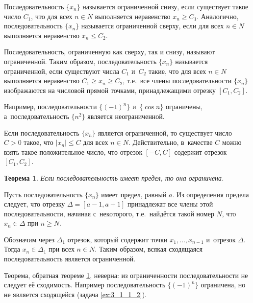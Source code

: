 
Последовательность $\{x_{n}\}$ называется ограниченной снизу, если существует
такое число $C_{1}$, что для всех $n \in N$ выполняется неравенство
$x_{n} \geqslant C_{1}$.
Аналогично, последовательность $\{x_{n}\}$ называется ограниченной сверху,
если для всех $n \in N$ выполняется неравенство $x_{n} \leqslant C_{2}$.

Последовательность, ограниченную как сверху, так и снизу, называют ограниченной.
Таким образом, последовательность $\{x_{n}\}$ называется ограниченной,
если существуют числа $C_{1}$ и~$C_{2}$ такие, что для всех $n \in N$
выполняется неравенство $C_{1} \geqslant x_{n} \geqslant C_{2}$,
т.е.\ все члены последовательности $\{x_{n}\}$ изображаются на числовой прямой
точками, принадлежащими отрезку $[C_{1}, C_{2}]$.

Например, последовательности $\{(-1)^{n}\}$ и~$\{\cos n\}$ ограничены,
а~последовательность $\{n^{2}\}$ является неограниченной.

\begin{Note}\label{nt:3_1_1}
Если последовательность $\{x_{n}\}$ является ограниченной, то существует число
$C > 0$ такое, что $|x_{n}| \leqslant C$ для всех $n \in N$.
Действительно, в~качестве $C$ можно взять такое положительное число,
что отрезок $[-C, C]$ содержит отрезок $[C_{1}, C_{2}]$.
\end{Note}

\newtheorem{Th}{Теорема}
\begin{Th}\label{th:3_1_1}
Если последовательность имеет предел, то она ограничена.
\end{Th}

Пусть последовательность $\{x_{n}\}$ имеет предел, равный $a$.
Из определения предела следует, что отрезку $\Delta = [a -1, a + 1]$ принадлежат
все члены этой последовательности, начиная с~некоторого, т.е.\ найдётся такой
номер $N$, что $x_{n} \in \Delta$ при $n \geqslant N$.

Обозначим через $\Delta_{1}$ отрезок, который содержит точки $x_{1}, \dots, x_{n-1}$
и~отрезок $\Delta$. Тогда $x_{n} \in \Delta_{1}$ при  всех $n \in N$.
Таким образом, всякая сходящаяся последовательность является ограниченной.

\begin{Note}\label{nt:3_1_2}
Теорема, обратная теореме \ref{th:3_1_1}, неверна: из ограниченности последовательности
не следует её сходимость. Например последовательность $\{(-1)^{n}\}$ ограничена,
но не является сходящейся (задача \ref{ex:3_1_1_2}).
\end{Note}

